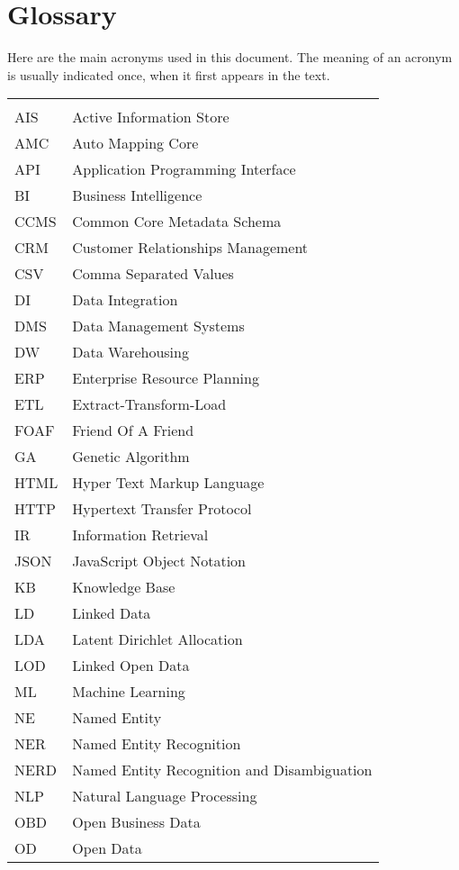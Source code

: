 \chapter*{Glossary}

Here are the main acronyms used in this document. The meaning of an acronym is usually indicated once, when it first appears in the text.

\begin{longtable}{lp{9cm}}
 &\\
 AIS & Active Information Store \\
 AMC & Auto Mapping Core \\
 API  & Application Programming Interface \\
 BI & Business Intelligence\\
 CCMS & Common Core Metadata Schema \\
 CRM & Customer Relationships Management\\
 CSV & Comma Separated Values\\
 DI & Data Integration \\
 DMS & Data Management Systems\\
 DW & Data Warehousing \\
 ERP &  Enterprise Resource Planning\\
 ETL & Extract-Transform-Load \\
 FOAF & Friend Of A Friend \\
 GA & Genetic Algorithm \\
 HTML &   Hyper Text Markup Language\\
 HTTP & Hypertext Transfer Protocol \\
 IR & Information Retrieval \\
 JSON & JavaScript Object Notation \\
 KB & Knowledge Base \\
 LD & Linked Data\\
 LDA & Latent Dirichlet Allocation \\
 LOD & Linked Open Data \\
 ML & Machine Learning \\
 NE & Named Entity \\
 NER & Named Entity Recognition\\
 NERD & Named Entity Recognition and Disambiguation \\
 NLP & Natural Language Processing \\
 OBD & Open Business Data\\
 OD & Open Data\\

\end{longtable}

